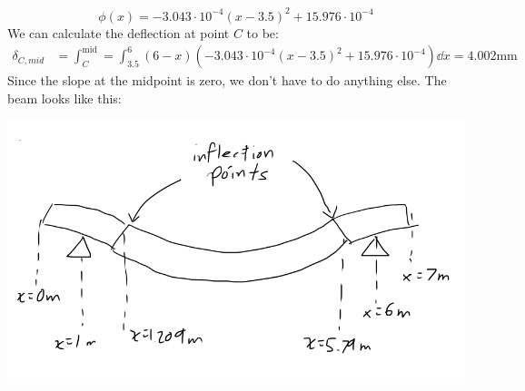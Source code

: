 \documentclass{article}
\begin{document}
\begin{equation}
  \phi(x) = -3.043\cdot10^{-4}\left(x-3.5\right)^{2}+15.976\cdot10^{-4}
\end{equation}
We can calculate the deflection at point $C$ to be:
\begin{align}
  \delta_{C,mid} &= \int_{C}^\text{mid} = \int_{3.5}^6 (6-x)\left(-3.043\cdot10^{-4}\left(x-3.5\right)^{2}+15.976\cdot10^{-4}\right) \dd{x} = 4.002\si{\milli\meter}
  \label{eq:}
\end{align}
Since the slope at the midpoint is zero, we don't have to do anything else. The beam looks like this:
\begin{center}
  \includegraphics[width=0.6\linewidth]{bad.png}
\end{center}
\newpage
\end{document}
